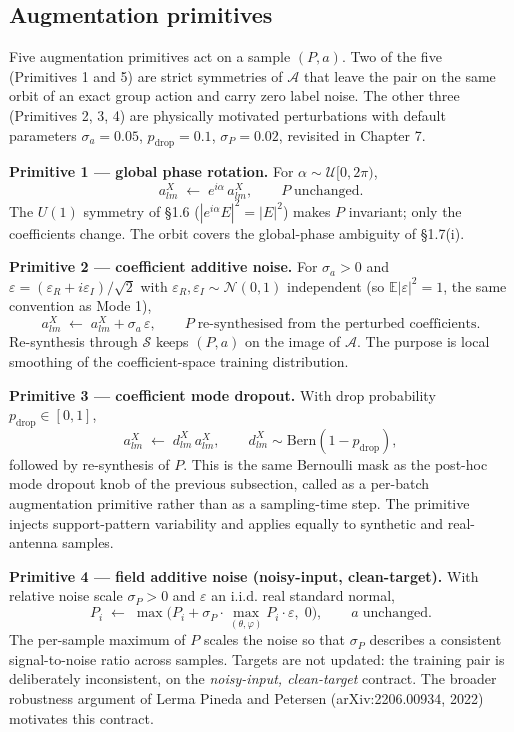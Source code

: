 \documentclass[
  english,
  11pt,
]{report}
\begin{document}
\subsection{Augmentation primitives}\label{augmentation-primitives}

Five augmentation primitives act on a sample \((P, a)\). Two of the five
(Primitives 1 and 5) are strict symmetries of \(\mathcal A\) that leave
the pair on the same orbit of an exact group action and carry zero label
noise. The other three (Primitives 2, 3, 4) are physically motivated
perturbations with default parameters \(\sigma_a = 0.05\),
\(p_\mathrm{drop} = 0.1\), \(\sigma_P = 0.02\), revisited in Chapter 7.

\textbf{Primitive 1 --- global phase rotation.} For
\(\alpha\sim\mathcal U[0,2\pi)\), \[
a^X_{lm}\;\leftarrow\;e^{i\alpha}\,a^X_{lm},\qquad P\;\text{unchanged}.
\] The \(U(1)\) symmetry of §1.6 (\(|e^{i\alpha} E|^2 = |E|^2\)) makes
\(P\) invariant; only the coefficients change. The orbit covers the
global-phase ambiguity of §1.7(i).

\textbf{Primitive 2 --- coefficient additive noise.} For
\(\sigma_a > 0\) and
\(\varepsilon = (\varepsilon_R + i\varepsilon_I)/\sqrt 2\) with
\(\varepsilon_R, \varepsilon_I \sim \mathcal N(0, 1)\) independent (so
\(\mathbb E|\varepsilon|^2 = 1\), the same convention as Mode 1), \[
a^X_{lm}\;\leftarrow\;a^X_{lm} + \sigma_a\,\varepsilon,\qquad P\;\text{re-synthesised from the perturbed coefficients}.
\] Re-synthesis through \(\mathcal S\) keeps \((P, a)\) on the image of
\(\mathcal A\). The purpose is local smoothing of the coefficient-space
training distribution.

\textbf{Primitive 3 --- coefficient mode dropout.} With drop probability
\(p_\mathrm{drop} \in [0, 1]\), \[
a^X_{lm}\;\leftarrow\;d^X_{lm}\,a^X_{lm},\qquad d^X_{lm}\sim\mathrm{Bern}(1 - p_\mathrm{drop}),
\] followed by re-synthesis of \(P\). This is the same Bernoulli mask as
the post-hoc mode dropout knob of the previous subsection, called as a
per-batch augmentation primitive rather than as a sampling-time step.
The primitive injects support-pattern variability and applies equally to
synthetic and real-antenna samples.

\textbf{Primitive 4 --- field additive noise (noisy-input,
clean-target).} With relative noise scale \(\sigma_P > 0\) and
\(\varepsilon\) an i.i.d. real standard normal, \[
P_{i}\;\leftarrow\;\max\!\bigl(P_{i} + \sigma_P\cdot\max_{(\theta,\varphi)} P_{i}\cdot\varepsilon,\;0\bigr),\qquad a\;\text{unchanged}.
\] The per-sample maximum of \(P\) scales the noise so that \(\sigma_P\)
describes a consistent signal-to-noise ratio across samples. Targets are
not updated: the training pair is deliberately inconsistent, on the
\emph{noisy-input, clean-target} contract. The broader robustness
argument of Lerma Pineda and Petersen (arXiv:2206.00934, 2022) motivates
this contract.
\end{document}
